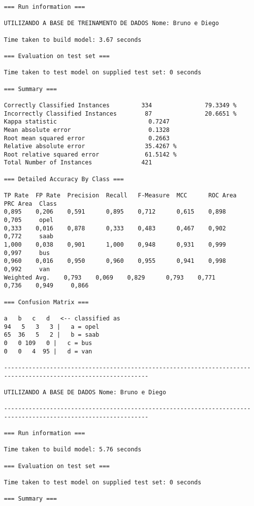 \documentclass[
	article,			%
	11pt,				%
	oneside,			%
	a4paper,			%
	english,			%
	brazil,				%
	sumario=tradicional
	]{abntex2}
\begin{document}
\begin{lstlisting}
=== Run information ===

UTILIZANDO A BASE DE TREINAMENTO DE DADOS Nome: Bruno e Diego

Time taken to build model: 3.67 seconds

=== Evaluation on test set ===

Time taken to test model on supplied test set: 0 seconds

=== Summary ===

Correctly Classified Instances         334               79.3349 %
Incorrectly Classified Instances        87               20.6651 %
Kappa statistic                          0.7247
Mean absolute error                      0.1328
Root mean squared error                  0.2663
Relative absolute error                 35.4267 %
Root relative squared error             61.5142 %
Total Number of Instances              421     

=== Detailed Accuracy By Class ===

TP Rate  FP Rate  Precision  Recall   F-Measure  MCC      ROC Area  PRC Area  Class
0,895    0,206    0,591      0,895    0,712      0,615    0,898     0,705     opel
0,333    0,016    0,878      0,333    0,483      0,467    0,902     0,772     saab
1,000    0,038    0,901      1,000    0,948      0,931    0,999     0,997     bus
0,960    0,016    0,950      0,960    0,955      0,941    0,998     0,992     van
Weighted Avg.    0,793    0,069    0,829      0,793    0,771      0,736    0,949     0,866     

=== Confusion Matrix ===

a   b   c   d   <-- classified as
94   5   3   3 |   a = opel
65  36   5   2 |   b = saab
0   0 109   0 |   c = bus
0   0   4  95 |   d = van

---------------------------------------------------------------------------------------------------------------

UTILIZANDO A BASE DE DADOS Nome: Bruno e Diego

---------------------------------------------------------------------------------------------------------------

=== Run information ===

Time taken to build model: 5.76 seconds

=== Evaluation on test set ===

Time taken to test model on supplied test set: 0 seconds

=== Summary ===


\end{lstlisting}
\end{document}
